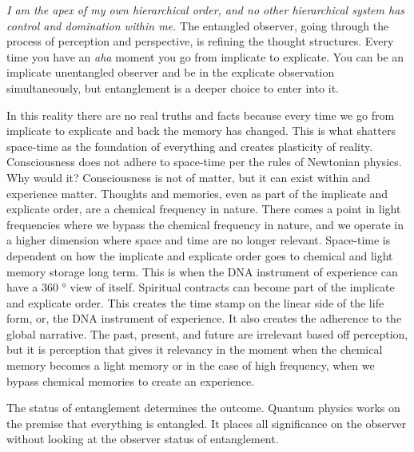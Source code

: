 \emph{I am the apex of my own hierarchical order, and no other
hierarchical system has control and domination within me.} The entangled
observer, going through the process of perception and perspective, is
refining the thought structures. Every time you have an \emph{aha}
moment you go from implicate to explicate. You can be an implicate
unentangled observer and be in the explicate observation simultaneously,
but entanglement is a deeper choice to enter into it.

In this reality there are no real truths and facts because every time we
go from implicate to explicate and back the memory has changed. This is
what shatters space-time as the foundation of everything and creates
plasticity of reality. Consciousness does not adhere to space-time per
the rules of Newtonian physics. Why would it? Consciousness is not of
matter, but it can exist within and experience matter. Thoughts and
memories, even as part of the implicate and explicate order, are a
chemical frequency in nature. There comes a point in light frequencies
where we bypass the chemical frequency in nature, and we operate in a
higher dimension where space and time are no longer relevant. Space-time
is dependent on how the implicate and explicate order goes to chemical
and light memory storage long term. This is when the DNA instrument of
experience can have a 360 ° view of itself. Spiritual contracts can
become part of the implicate and explicate order. This creates the time
stamp on the linear side of the life form, or, the DNA instrument of
experience. It also creates the adherence to the global narrative. The
past, present, and future are irrelevant based off perception, but it is
perception that gives it relevancy in the moment when the chemical
memory becomes a light memory or in the case of high frequency, when we
bypass chemical memories to create an experience.

The status of entanglement determines the outcome. Quantum physics works
on the premise that everything is entangled. It places all significance
on the observer without looking at the observer status of entanglement.

